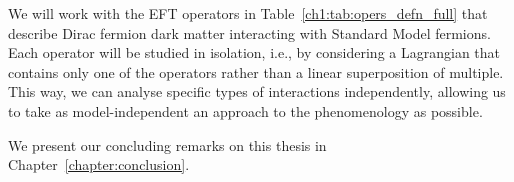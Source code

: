We will work with the EFT operators in Table~\ref{ch1:tab:opers_defn_full} that describe Dirac fermion dark matter interacting with Standard Model fermions. Each operator will be studied in isolation, i.e., by considering a Lagrangian that contains only one of the operators rather than a linear superposition of multiple. This way, we can analyse specific types of interactions independently, allowing us to take as model-independent an approach to the phenomenology as possible. 

We present our concluding remarks on this thesis in Chapter~\ref{chapter:conclusion}.